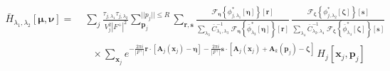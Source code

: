 \documentclass[DM,authoryear,toc]{lsstdoc}
\begin{document}
\begin{align}
    \bar{H}_{\lambda_1,\lambda_2}[\bm{\mu},\bm{\nu}]
    =&\;
    \sum_j
    \frac{\tau_{j,\lambda_1}\tau_{j,\lambda_2}}{V_j^2|F^+|^2}
    \!\!\!
    \sum_{\bm{p}_j}^{||p_j|| \le R}
    \!\!
    \sum_{\bm{r},\bm{s}}
        \frac{
            \mathcal{F}_{\bm{\eta}}\!\left\{
            \phi^*_{j,\lambda_1}\!\left[
                \bm{\eta}
            \right]
            \right\}\!\left[
                \bm{r}
            \right]
        }{
            \sum\limits_{\lambda_3}
            \bar{C}_{\lambda_1,\lambda_3}^{-1}
            \;
            \mathcal{F}_{\bm{\eta}}\!\left\{
                \bar{\phi}^*_{\lambda_3}[\bm{\eta}]
            \right\}\!\left[
                \bm{r}
            \right]
        }
        \,
        \frac{
            \mathcal{F}_{\bm{\zeta}}\!\left\{
            \phi^*_{j,\lambda_2}\!\left[
                \bm{\zeta}
            \right]
            \right\}\!\left[
                \bm{s}
            \right]
        }{
            \sum\limits_{\lambda_4}
            \bar{C}_{\lambda_2,\lambda_4}^{-1}
            \;
            \mathcal{F}_{\bm{\zeta}}\!\left\{
                \bar{\phi}^*_{\lambda_4}[\bm{\zeta}]
            \right\}\!\left[
                \bm{s}
            \right]
        }
    \\
    &\quad\times
        \sum_{\bm{x}_j}
        e^{
            -\frac{2\pi i}{|F^+|}\bm{r}\cdot[\bm{A}_j(\bm{x}_j)-\bm{\eta}]
            -\frac{2\pi i}{|F^+|}\bm{s}\cdot[\bm{A}_j(\bm{x}_j)+\bm{A}_k(\bm{p}_j)-\bm{\zeta}]
        }
    \,
    H_j[\bm{x}_j, \bm{p}_j]
\end{align}



\end{document}

